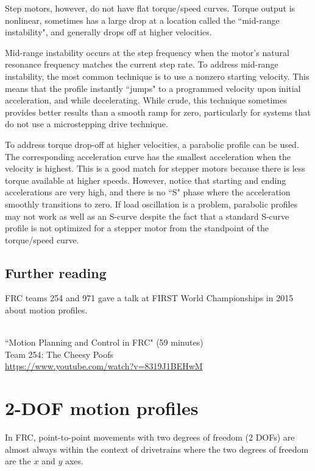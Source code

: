 Step motors, however, do not have flat torque/speed curves. Torque output is
nonlinear, sometimes has a large drop at a location called the ``mid-range
instability", and generally drops off at higher velocities.

Mid-range instability occurs at the step frequency when the motor's natural
resonance frequency matches the current step rate. To address mid-range
instability, the most common technique is to use a nonzero starting velocity.
This means that the profile instantly ``jumps" to a programmed velocity upon
initial acceleration, and while decelerating. While crude, this technique
sometimes provides better results than a smooth ramp for zero, particularly for
\glspl{system} that do not use a microstepping drive technique.

To address torque drop-off at higher velocities, a parabolic profile can be
used. The corresponding acceleration curve has the smallest acceleration when
the velocity is highest. This is a good match for stepper motors because there
is less torque available at higher speeds. However, notice that starting and
ending accelerations are very high, and there is no ``S" phase where the
acceleration smoothly transitions to zero. If load oscillation is a problem,
parabolic profiles may not work as well as an S-curve despite the fact that a
standard S-curve profile is not optimized for a stepper motor from the
standpoint of the torque/speed curve.

\subsection{Further reading}

FRC teams 254 and 971 gave a talk at FIRST World Championships in 2015 about
motion profiles.
\begin{bookfigure}
   \\
  ``Motion Planning and Control in FRC" (59 minutes) \\
  \footnotesize Team 254: The Cheesy Poofs \\
  \url{https://www.youtube.com/watch?v=8319J1BEHwM}
\end{bookfigure}

\section{2-DOF motion profiles}

In FRC, point-to-point movements with two degrees of freedom ($2$ DOFs) are
almost always within the context of drivetrains where the two degrees of freedom
are the $x$ and $y$ axes.

